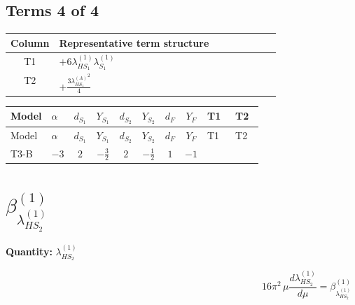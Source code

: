 \documentclass[8pt]{article}
\begin{document}
\begin{landscape}
\subsection*{Terms 4 of 4}
\begin{center}
\begin{tabular}{@{}c >{\raggedright\arraybackslash}p{0.82\linewidth}@{}}
\toprule
Column & Representative term structure \\
\midrule
T1 & \(\displaystyle +6 {\lambda_{HS_1}^{(1)}} {\lambda_{S_1}^{(1)}}\) \\
\midrule
T2 & \(\displaystyle +\frac{3 {\lambda_{HS_1}^{(A)}}^2}{4}\) \\
\midrule
\bottomrule
\end{tabular}
\end{center}
\smallskip
\tiny
\begin{longtable}{@{}llcccccc >{\raggedright\arraybackslash}p{0.21\linewidth} >{\raggedright\arraybackslash}p{0.21\linewidth}@{}}
\toprule
Model & $\alpha$ & $d_{S_1}$ & $Y_{S_1}$ & $d_{S_2}$ & $Y_{S_2}$ & $d_F$ & $Y_F$ & T1 & T2 \\
\midrule
\endfirsthead
\toprule
Model & $\alpha$ & $d_{S_1}$ & $Y_{S_1}$ & $d_{S_2}$ & $Y_{S_2}$ & $d_F$ & $Y_F$ & T1 & T2 \\
\midrule
\endhead
T3-B & $-3$ & $2$ & $-\frac{3}{2}$ & $2$ & $-\frac{1}{2}$ & $1$ & $-1$ & \scriptsize\adjustbox{max width=\linewidth}{$\begin{gathered} +6 {\lambda_{HS_1}^{(1)}} {\lambda_{S_1}^{(1)}}\end{gathered}$} & \scriptsize\adjustbox{max width=\linewidth}{$\begin{gathered} +\frac{3 {\lambda_{HS_1}^{(A)}}^2}{4}\end{gathered}$} \\
\midrule
\bottomrule
\end{longtable}
\clearpage
\section*{$\beta_{\lambda_{HS_2}^{(1)}}^{(1)}$}
\noindent\textbf{Quantity: }$\lambda_{HS_2}^{(1)}$\par\smallskip
\[16\pi^2\,\mu\frac{d \lambda_{HS_2}^{(1)}}{d\mu}=\beta_{\lambda_{HS_2}^{(1)}}^{(1)}\]

\end{landscape}
\end{document}
